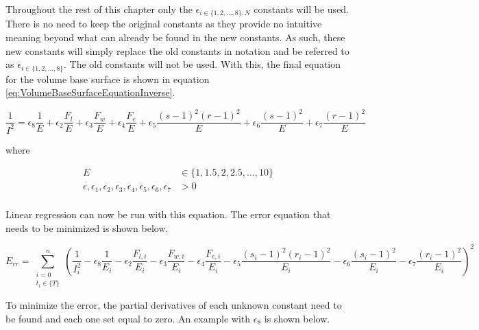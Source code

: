 Throughout the rest of this chapter only the $\epsilon_{i\in\{1,2,...,8\},N}$ constants will be used. There is no need to keep the original constants as they provide no intuitive meaning beyond what can already be found in the new constants. As such, these new constants will simply replace the old constants in notation and be referred to as $\epsilon_{i\in\{1,2,...,8\}}$. The old constants will not be used. With this, the final equation for the volume base surface is shown in equation \ref{eq:VolumeBaseSurfaceEquationInverse}.

\begin{minipage}{\textwidth}
	\begin{equation}
		\frac{1}{I^2}=
			\epsilon_{8}\frac{1}{E}+
			\epsilon_{2}\frac{F_l}{E}+
			\epsilon_{3}\frac{F_w}{E}+
			\epsilon_{4}\frac{F_e}{E}+
			\epsilon_{5}\frac{(s-1)^2(r-1)^2}{E}+
			\epsilon_{6}\frac{(s-1)^2}{E}+
			\epsilon_{7}\frac{(r-1)^2}{E}
		\label{eq:VolumeBaseSurfaceEquationInverse}
	\end{equation}
	\centerline{where}
	\begin{equation*}
		\begin{split}
	        E & \in \{ 1,1.5,2,2.5, \dots ,10 \} \\
	        \epsilon, \epsilon_1, \epsilon_2, \epsilon_3, \epsilon_4, \epsilon_5,\epsilon_6,\epsilon_7 & > 0 \\
	    \end{split}
	\end{equation*}
\end{minipage}

Linear regression can now be run with this equation. The error equation that needs to be minimized is shown below.

\begin{equation*}
	E_{rr}=\sum_{
            \substack{i=0\\ t_i\in \{ T \}}
        }^n \left(
        \frac{1}{I_i^2}
        -\epsilon_8 \frac{1}{E_i}
        -\epsilon_2 \frac{F_{l,i}}{E_i}
        -\epsilon_3 \frac{F_{w,i}}{E_i}
        -\epsilon_4 \frac{F_{e,i}}{E_i}
        -\epsilon_5 \frac{(s_i-1)^2(r_i-1)^2}{E_i}
        -\epsilon_6 \frac{(s_i-1)^2}{E_i}
        -\epsilon_7 \frac{(r_i-1)^2}{E_i}
    \right)^2
\end{equation*}

To minimize the error, the partial derivatives of each unknown constant need to be found and each one set equal to zero. An example with $\epsilon_8$ is shown below.

